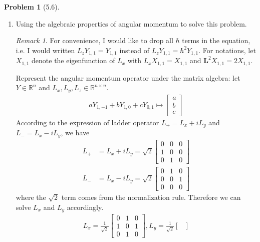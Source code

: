 \documentclass[twoside,11pt]{article}
\newcommand{\R}{\mathbb{R}}
\theoremstyle{definition}
\newtheorem{problem}{Problem}
\theoremstyle{remark}
\newtheorem*{remark}{Remark}
\begin{document}
\begin{problem}[5.6]
\begin{enumerate}[label=(\alph*)]
        \item Using the algebraic properties of angular momentum to solve this problem.
        \begin{remark}
            For convenience, I would like to drop all $\hbar$ terms in the equation, i.e.
            I would written $L_z Y_{1,1} = Y_{1,1}$ instead of $L_z Y_{1,1}=\hbar^2 Y_{1,1}$.
            For notations, let $X_{1,1}$ denote the eigenfunction of $L_x$ with
            $L_x X_{1,1} = X_{1,1}$ and $\mathbf{L}^2 X_{1,1} = 2 X_{1,1}$.
        \end{remark}
        Represent the angular momentum operator under the matrix algebra: 
        let $Y\in\R^n$ and $L_x, L_y, L_z\in\R^{n\times n}$.
        \begin{align*}
            aY_{1,-1} + bY_{1,0} + cY_{0,1}\mapsto \begin{bmatrix}
                a\\ b\\ c
            \end{bmatrix}
        \end{align*}
        According to the expression of ladder operator $L_+=L_x+iL_y$ and 
        $L_-=L_x-iL_y$, we have
        \begin{align*}
            L_+ &= L_x + i L_y = \sqrt{2}\begin{bmatrix}
                0 & 0 & 0 \\
                1 & 0 & 0 \\
                0 & 1 & 0
            \end{bmatrix}\\
            L_- &= L_x - i L_y = \sqrt{2}\begin{bmatrix}
                0 & 1 & 0 \\
                0 & 0 & 1 \\
                0 & 0 & 0
            \end{bmatrix}
        \end{align*}
        where the $\sqrt{2}$ term comes from the normalization rule.
        Therefore we can solve $L_x$ and $L_y$ accordingly.
        \begin{align*}
            L_x = \frac{1}{\sqrt{2}}\begin{bmatrix}
                0 & 1 & 0\\
                1 & 0 & 1\\
                0 & 1 & 0
            \end{bmatrix}, 
            L_y = \frac{1}{\sqrt{2}}\begin{bmatrix}

\end{bmatrix}
\end{align*}
\end{enumerate}
\end{problem}
\end{document}
